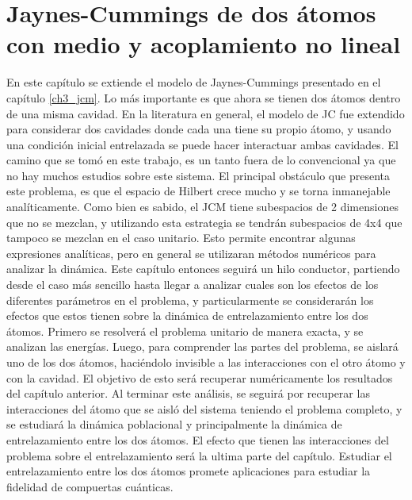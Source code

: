 \chapter{Jaynes-Cummings de dos átomos con medio y acoplamiento no lineal}
\label{ch4_dinamica}

\pagestyle{fancy}
\fancyhf{}
\fancyhead[LE]{\nouppercase{\rightmark\hfill}}
\fancyhead[RO]{\nouppercase{\leftmark\hfill}}
\fancyfoot[LE,RO]{\hfill\thepage\hfill}

En este capítulo se extiende el modelo de Jaynes-Cummings presentado en el capítulo \ref{ch3_jcm}. Lo más importante es que ahora se tienen dos átomos dentro de una misma cavidad. En la literatura en general, el modelo de JC fue extendido para considerar dos cavidades donde cada una tiene su propio átomo, y usando una condición inicial entrelazada se puede hacer interactuar ambas cavidades. El camino que se tomó en este trabajo, es un tanto fuera de lo convencional ya que no hay muchos estudios sobre este sistema. El principal obstáculo que presenta este problema, es que el espacio de Hilbert crece mucho y se torna inmanejable analíticamente. Como bien es sabido, el JCM tiene subespacios de 2 dimensiones que no se mezclan, y utilizando esta estrategia  se tendrán subespacios de 4x4 que tampoco se mezclan en el caso unitario. Esto permite encontrar algunas expresiones analíticas, pero en general se utilizaran métodos numéricos para analizar la dinámica. \newline
Este capítulo entonces seguirá un hilo conductor, partiendo desde el caso más sencillo hasta llegar a analizar cuales son los efectos de los diferentes parámetros en el problema, y particularmente se considerarán los efectos que estos tienen sobre la dinámica de entrelazamiento entre los dos átomos. 
Primero se resolverá el problema unitario de manera exacta, y se analizan las energías. Luego, para comprender las partes del problema, se aislará uno de los dos átomos, haciéndolo invisible a las interacciones con el otro átomo y con la cavidad. El objetivo de esto será recuperar numéricamente los resultados del capítulo anterior. Al terminar este análisis, se seguirá por recuperar las interacciones del átomo que se aisló del sistema teniendo el problema completo, y se estudiará la dinámica poblacional y principalmente la dinámica de entrelazamiento entre los dos átomos. El efecto que tienen las interacciones del problema sobre el entrelazamiento será la ultima parte del capítulo. Estudiar el entrelazamiento entre los dos átomos promete aplicaciones para estudiar la fidelidad de compuertas cuánticas.
